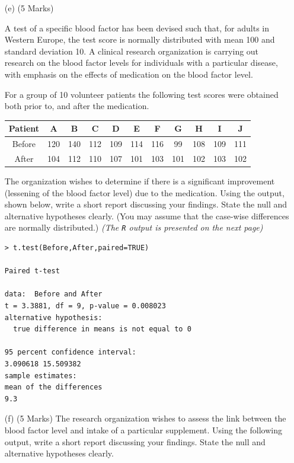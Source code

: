 \documentclass[a4paper,12pt]{article}
\begin{document}
\begin{itemize}
\item[(e)] (5 Marks)

A test of a specific blood factor has been devised such that, for adults in Western Europe, the test score is normally distributed with mean 100 and standard deviation 10. A clinical research organization is carrying out research on the blood factor levels for individuals with a particular disease, with emphasis on the effects of medication on the blood factor level.

For a group of 10 volunteer patients the following test scores were obtained both prior to, and after the medication.

\begin{center}
\begin{tabular}{|c||c|c|c|c|c|c|c|c|c|c|} \hline 
Patient	& A	& B	& C	& D	& E	& F	& G &	H &	I &	J	\\ \hline  \hline
Before	& 120& 	140	& 112 &	109&	114	& 116 &	99 & 	108 &	109	& 111 \\ \hline 	
After	& 104&	112	& 110 &	107&	101	& 103 &	101	& 102&	103	& 102 \\ \hline 
\end{tabular} 
\end{center}
	


The organization wishes to determine if there is a significant improvement (lessening of the blood factor level) due to the medication.  Using the output, shown below, write a short report discussing your findings. State the null and alternative hypotheses clearly. (You may assume that the case-wise differences are normally distributed.)
\textit{(The \texttt{R} output is presented on the next page)}
\newpage

\begin{framed}
\begin{verbatim}
> t.test(Before,After,paired=TRUE)

Paired t-test

data:  Before and After
t = 3.3881, df = 9, p-value = 0.008023
alternative hypothesis: 
  true difference in means is not equal to 0
  
95 percent confidence interval:
3.090618 15.509382
sample estimates:
mean of the differences 
9.3 
\end{verbatim}
\end{framed}
\bigskip

\item[(f)] (5 Marks)
The research organization wishes to assess the link between the blood factor level and intake of a particular supplement.  Using the following output, write a short report discussing your findings. State the null and alternative hypotheses clearly.




\end{itemize}
\end{document}
